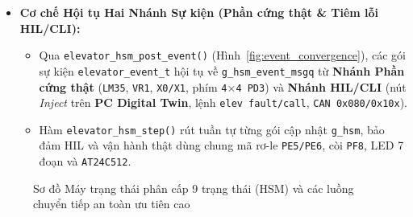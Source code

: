 \begin{itemize}[nosep]
\begin{itemize}[nosep]
        \item \textit{Lớp 2 -- BSP (\texttt{bsp\_gpio\_set\_motor\_outputs} / \texttt{bsp\_gpio\_exti.c}):} Kiểm tra chéo \texttt{up\_en} và \texttt{down\_en} trước khi ghi GPIO; nếu cùng bằng \texttt{true}, lập tức cắt \texttt{PE5=0, PE6=0}, ghi log lỗi và trả \texttt{-EINVAL}.
    \end{itemize}
    \item \textbf{Cơ chế Hội tụ Hai Nhánh Sự kiện (Phần cứng thật \& Tiêm lỗi HIL/CLI):}
    \begin{itemize}[nosep]
        \item Qua \texttt{elevator\_hsm\_post\_event()} (Hình~\ref{fig:event_convergence}), các gói sự kiện \texttt{elevator\_event\_t} hội tụ về \texttt{g\_hsm\_event\_msgq} từ \textbf{Nhánh Phần cứng thật} (\texttt{LM35}, \texttt{VR1}, \texttt{X0/X1}, phím \texttt{4$\times$4 PD3}) và \textbf{Nhánh HIL/CLI} (nút \textit{Inject} trên \textbf{PC Digital Twin}, lệnh \texttt{elev fault/call}, \texttt{CAN 0x080/0x10x}).
        \item Hàm \texttt{elevator\_hsm\_step()} rút tuần tự từng gói cập nhật \texttt{g\_hsm}, bảo đảm HIL và vận hành thật dùng chung mã rơ-le \texttt{PE5/PE6}, còi \texttt{PF8}, LED 7 đoạn và \texttt{AT24C512}.
    \end{itemize}
\end{itemize}

\begin{figure}[H]
\centering

\caption{Sơ đồ Máy trạng thái phân cấp 9 trạng thái (HSM) và các luồng chuyển tiếp an toàn ưu tiên cao}
\label{fig:hsm_states}
\end{figure}

